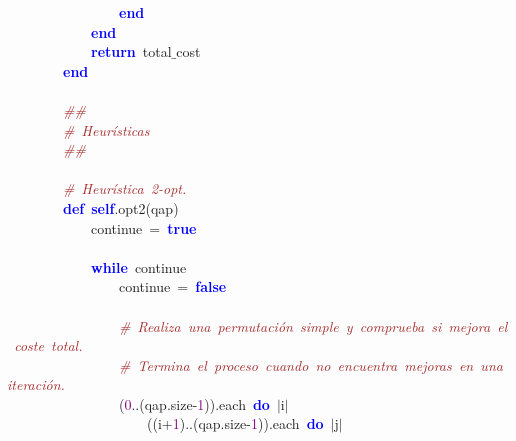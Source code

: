 \mbox{}\ \ \ \ \ \ \ \ \ \ \ \ \ \ \ \ \textbf{\textcolor{Blue}{end}} \\
\mbox{}\ \ \ \ \ \ \ \ \ \ \ \ \textbf{\textcolor{Blue}{end}} \\
\mbox{}\ \ \ \ \ \ \ \ \ \ \ \ \textbf{\textcolor{Blue}{return}}\ total$\_$cost \\
\mbox{}\ \ \ \ \ \ \ \ \textbf{\textcolor{Blue}{end}} \\
\mbox{} \\
\mbox{}\ \ \ \ \ \ \ \ \textit{\textcolor{Brown}{\#\#}} \\
\mbox{}\ \ \ \ \ \ \ \ \textit{\textcolor{Brown}{\#\ Heurísticas}} \\
\mbox{}\ \ \ \ \ \ \ \ \textit{\textcolor{Brown}{\#\#}} \\
\mbox{} \\
\mbox{}\ \ \ \ \ \ \ \ \textit{\textcolor{Brown}{\#\ Heurística\ 2-opt.}} \\
\mbox{}\ \ \ \ \ \ \ \ \textbf{\textcolor{Blue}{def}}\ \textbf{\textcolor{Blue}{self}}\textcolor{BrickRed}{.}opt2\textcolor{BrickRed}{(}qap\textcolor{BrickRed}{)} \\
\mbox{}\ \ \ \ \ \ \ \ \ \ \ \ continue\ \textcolor{BrickRed}{=}\ \textbf{\textcolor{Blue}{true}} \\
\mbox{}\ \ \ \ \ \ \ \ \ \ \ \  \\
\mbox{}\ \ \ \ \ \ \ \ \ \ \ \ \textbf{\textcolor{Blue}{while}}\ continue \\
\mbox{}\ \ \ \ \ \ \ \ \ \ \ \ \ \ \ \ continue\ \textcolor{BrickRed}{=}\ \textbf{\textcolor{Blue}{false}} \\
\mbox{}\ \ \ \ \ \ \ \ \ \ \ \ \ \ \ \  \\
\mbox{}\ \ \ \ \ \ \ \ \ \ \ \ \ \ \ \ \textit{\textcolor{Brown}{\#\ Realiza\ una\ permutación\ simple\ y\ comprueba\ si\ mejora\ el\ coste\ total.}} \\
\mbox{}\ \ \ \ \ \ \ \ \ \ \ \ \ \ \ \ \textit{\textcolor{Brown}{\#\ Termina\ el\ proceso\ cuando\ no\ encuentra\ mejoras\ en\ una\ iteración.}} \\
\mbox{}\ \ \ \ \ \ \ \ \ \ \ \ \ \ \ \ \textcolor{BrickRed}{(}\textcolor{Purple}{0}\textcolor{BrickRed}{..(}qap\textcolor{BrickRed}{.}size\textcolor{BrickRed}{-}\textcolor{Purple}{1}\textcolor{BrickRed}{)).}each\ \textbf{\textcolor{Blue}{do}}\ \textcolor{BrickRed}{$|$}i\textcolor{BrickRed}{$|$} \\
\mbox{}\ \ \ \ \ \ \ \ \ \ \ \ \ \ \ \ \ \ \ \ \textcolor{BrickRed}{((}i\textcolor{BrickRed}{+}\textcolor{Purple}{1}\textcolor{BrickRed}{)..(}qap\textcolor{BrickRed}{.}size\textcolor{BrickRed}{-}\textcolor{Purple}{1}\textcolor{BrickRed}{)).}each\ \textbf{\textcolor{Blue}{do}}\ \textcolor{BrickRed}{$|$}j\textcolor{BrickRed}{$|$} \\
